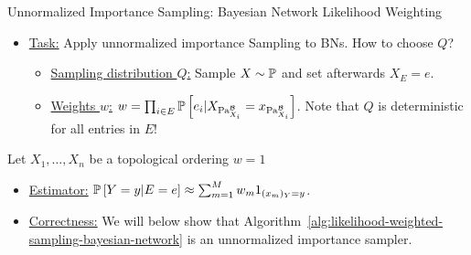 \begin{frame}{Unnormalized Importance Sampling: Bayesian Network Likelihood Weighting}
\begin{itemize}
    \item \underline{Task:} Apply unnormalized importance Sampling to BNs. How to choose $Q$?
    \begin{itemize}
        \pause \item \underline{Sampling distribution $Q$:} Sample $X \sim \Pb$ and set afterwards $X_E = e$.
        \pause \item \underline{Weights $w$:} $w = \prod_{i \in E} \Pb[e_i | X_{\Pa{\mathcal{B}}{X_i}} = x_{\Pa{\mathcal{B}}{X_i}}]$. Note that $Q$ is deterministic for all entries in $E$!
    \end{itemize}
\end{itemize}
\pause
\begin{algorithm}[H]
    \caption{Likelihood Weighted Sampling in a Bayesian Network}
    \label{alh:likelihood-weighted-sampling-bayesian-network}
    Let $X_1,\ldots,X_n$ be a topological ordering\;
    $w = 1$\;
    \pause
\end{algorithm}
\begin{itemize}
    \pause \item \underline{Estimator:} $\Pb[Y = y | E = e] \approx \sum_{m=1}^M w_m 1_{(x_m)_Y = y}$.
    \pause \item \underline{Correctness:} We will below show that Algorithm~\ref{alg:likelihood-weighted-sampling-bayesian-network} is an unnormalized importance sampler.
\end{itemize}
\end{frame}

